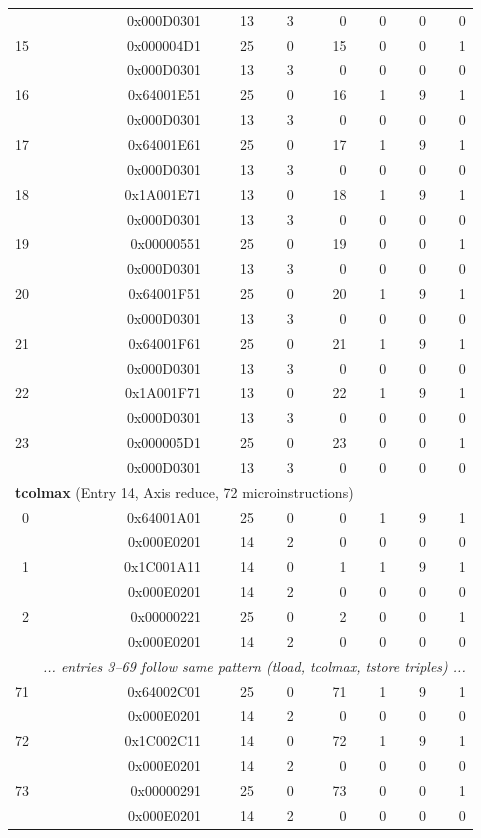 \begin{longtable}{r r r r r r r r}
  & 0x000D0301 & 13 & 3 & 0 & 0 & 0 & 0 \\
15 & 0x000004D1 & 25 & 0 & 15 & 0 & 0 & 1 \\
  & 0x000D0301 & 13 & 3 & 0 & 0 & 0 & 0 \\
16 & 0x64001E51 & 25 & 0 & 16 & 1 & 9 & 1 \\
  & 0x000D0301 & 13 & 3 & 0 & 0 & 0 & 0 \\
17 & 0x64001E61 & 25 & 0 & 17 & 1 & 9 & 1 \\
  & 0x000D0301 & 13 & 3 & 0 & 0 & 0 & 0 \\
18 & 0x1A001E71 & 13 & 0 & 18 & 1 & 9 & 1 \\
  & 0x000D0301 & 13 & 3 & 0 & 0 & 0 & 0 \\
19 & 0x00000551 & 25 & 0 & 19 & 0 & 0 & 1 \\
  & 0x000D0301 & 13 & 3 & 0 & 0 & 0 & 0 \\
20 & 0x64001F51 & 25 & 0 & 20 & 1 & 9 & 1 \\
  & 0x000D0301 & 13 & 3 & 0 & 0 & 0 & 0 \\
21 & 0x64001F61 & 25 & 0 & 21 & 1 & 9 & 1 \\
  & 0x000D0301 & 13 & 3 & 0 & 0 & 0 & 0 \\
22 & 0x1A001F71 & 13 & 0 & 22 & 1 & 9 & 1 \\
  & 0x000D0301 & 13 & 3 & 0 & 0 & 0 & 0 \\
23 & 0x000005D1 & 25 & 0 & 23 & 0 & 0 & 1 \\
  & 0x000D0301 & 13 & 3 & 0 & 0 & 0 & 0 \\

\multicolumn{8}{l}{\textbf{tcolmax} (Entry 14, Axis reduce, 72 microinstructions)} \\
0 & 0x64001A01 & 25 & 0 & 0 & 1 & 9 & 1 \\
  & 0x000E0201 & 14 & 2 & 0 & 0 & 0 & 0 \\
1 & 0x1C001A11 & 14 & 0 & 1 & 1 & 9 & 1 \\
  & 0x000E0201 & 14 & 2 & 0 & 0 & 0 & 0 \\
2 & 0x00000221 & 25 & 0 & 2 & 0 & 0 & 1 \\
  & 0x000E0201 & 14 & 2 & 0 & 0 & 0 & 0 \\
  & \multicolumn{7}{r}{\textit{... entries 3--69 follow same pattern (tload, tcolmax, tstore triples) ...}} \\
71 & 0x64002C01 & 25 & 0 & 71 & 1 & 9 & 1 \\
  & 0x000E0201 & 14 & 2 & 0 & 0 & 0 & 0 \\
72 & 0x1C002C11 & 14 & 0 & 72 & 1 & 9 & 1 \\
  & 0x000E0201 & 14 & 2 & 0 & 0 & 0 & 0 \\
73 & 0x00000291 & 25 & 0 & 73 & 0 & 0 & 1 \\
  & 0x000E0201 & 14 & 2 & 0 & 0 & 0 & 0 \\


\end{longtable}
